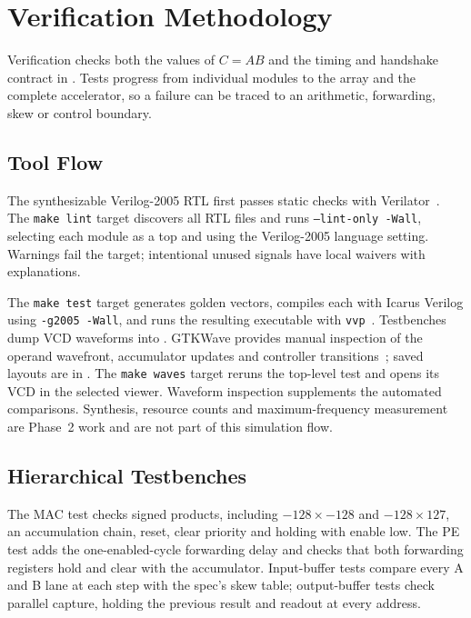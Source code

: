 
\section{Verification Methodology}
Verification checks both the values of $C=AB$ and the timing and handshake
contract in . Tests progress from individual modules to
the array and the complete accelerator, so a failure can be traced to an
arithmetic, forwarding, skew or control boundary.

\subsection{Tool Flow}
The synthesizable Verilog-2005 RTL first passes static checks with
Verilator~\cite{verilatorguide}. The \texttt{make lint} target discovers all
RTL files and runs \texttt{--lint-only -Wall}, selecting each module as a
top and using the Verilog-2005 language setting. Warnings fail the target;
intentional unused signals have local waivers with explanations.

The \texttt{make test} target generates golden vectors, compiles each
 with Icarus Verilog using \texttt{-g2005 -Wall}, and runs
the resulting executable with \texttt{vvp}~\cite{icarussimulation}.
Testbenches dump VCD waveforms into . GTKWave provides manual
inspection of the operand wavefront, accumulator updates and controller
transitions~\cite{gtkwavedocs}; saved layouts are in .
The \texttt{make waves} target reruns the top-level test and opens its VCD
in the selected viewer. Waveform inspection supplements the automated
comparisons. Synthesis, resource counts and maximum-frequency measurement
are Phase~2 work and are not part of this simulation flow.

\subsection{Hierarchical Testbenches}
The MAC test checks signed products, including $-128\times-128$ and
$-128\times127$, an accumulation chain, reset, clear priority and holding
with enable low. The PE test adds the one-enabled-cycle forwarding delay
and checks that both forwarding registers hold and clear with the
accumulator. Input-buffer tests compare every A and B lane at each step
with the spec's skew table; output-buffer tests check parallel capture,
holding the previous result and readout at every address.

